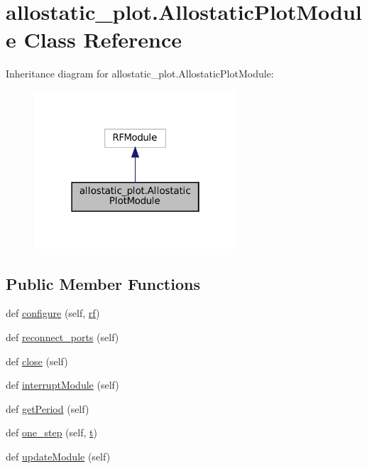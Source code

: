 \hypertarget{classallostatic__plot_1_1AllostaticPlotModule}{}\section{allostatic\+\_\+plot.\+Allostatic\+Plot\+Module Class Reference}
\label{classallostatic__plot_1_1AllostaticPlotModule}


Inheritance diagram for allostatic\+\_\+plot.\+Allostatic\+Plot\+Module\+:
\nopagebreak
\begin{figure}[H]
\begin{center}
\leavevmode
\includegraphics[width=214pt]{classallostatic__plot_1_1AllostaticPlotModule__inherit__graph}
\end{center}
\end{figure}
\subsection*{Public Member Functions}
\begin{DoxyCompactItemize}
\item 
def \hyperlink{classallostatic__plot_1_1AllostaticPlotModule_a1c784d20578b5195d889ba906f4aa4d1}{configure} (self, \hyperlink{namespaceallostatic__plot_a4b1d388f7cddaea7d81cf5c088c3a441}{rf})
\item 
def \hyperlink{classallostatic__plot_1_1AllostaticPlotModule_ae588cd72041118c2612d1cad8a981d88}{reconnect\+\_\+ports} (self)
\item 
def \hyperlink{classallostatic__plot_1_1AllostaticPlotModule_a502d91cdd375d04bdcd1530e8eb283ea}{close} (self)
\item 
def \hyperlink{classallostatic__plot_1_1AllostaticPlotModule_ad42301080879ff74396dd079e71f9186}{interrupt\+Module} (self)
\item 
def \hyperlink{classallostatic__plot_1_1AllostaticPlotModule_a66ab2903cf0a5c68e34799f4773f1cbf}{get\+Period} (self)
\item 
def \hyperlink{classallostatic__plot_1_1AllostaticPlotModule_a7e391f34e1880a38b47f83a40ba71a12}{one\+\_\+step} (self, \hyperlink{classallostatic__plot_1_1AllostaticPlotModule_ae20ad9e6f886275492e34cded00f1046}{t})
\item 
def \hyperlink{classallostatic__plot_1_1AllostaticPlotModule_aff4e8f8ee003c6ef52dc09f0512bacba}{update\+Module} (self)
\end{DoxyCompactItemize}
